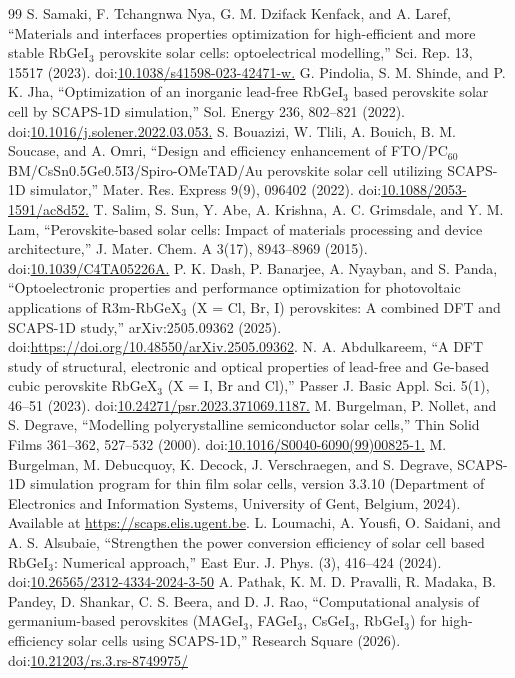 \documentclass[aip,amsmath,amssymb,preprint]{revtex4-2}
\begin{document}
\begin{thebibliography}{99}
 S. Samaki, F. Tchangnwa Nya, G. M. Dzifack Kenfack, and A. Laref, ``Materials and interfaces properties optimization for high-efficient and more stable RbGeI$_{3}$ perovskite solar cells: optoelectrical modelling,'' Sci. Rep. 13, 15517 (2023). doi:\url{10.1038/s41598-023-42471-w.}
 G. Pindolia, S. M. Shinde, and P. K. Jha, ``Optimization of an inorganic lead-free RbGeI$_{3}$ based perovskite solar cell by SCAPS-1D simulation,'' Sol. Energy 236, 802--821 (2022). doi:\url{10.1016/j.solener.2022.03.053.}
 S. Bouazizi, W. Tlili, A. Bouich, B. M. Soucase, and A. Omri, ``Design and efficiency enhancement of FTO/\allowbreak{}PC$_{60}$BM/CsSn0.5Ge0.5I3/\allowbreak{}Spiro-OMeTAD/\allowbreak{}Au perovskite solar cell utilizing SCAPS-1D simulator,'' Mater. Res. Express 9(9), 096402 (2022). doi:\url{10.1088/2053-1591/ac8d52.}
 T. Salim, S. Sun, Y. Abe, A. Krishna, A. C. Grimsdale, and Y. M. Lam, ``Perovskite-based solar cells: Impact of materials processing and device architecture,'' J. Mater. Chem. A 3(17), 8943--8969 (2015). doi:\url{10.1039/C4TA05226A.}
 P. K. Dash, P. Banarjee, A. Nyayban, and S. Panda, ``Optoelectronic properties and performance optimization for photovoltaic applications of R3m-RbGeX$_{3}$ (X = Cl, Br, I) perovskites: A combined DFT and SCAPS-1D study,'' arXiv:2505.09362 (2025). doi:\url{https://doi.org/10.48550/arXiv.2505.09362}.
 N. A. Abdulkareem, ``A DFT study of structural, electronic and optical properties of lead-free and Ge-based cubic perovskite RbGeX$_{3}$ (X = I, Br and Cl),'' Passer J. Basic Appl. Sci. 5(1), 46--51 (2023). doi:\url{10.24271/psr.2023.371069.1187.}
 M. Burgelman, P. Nollet, and S. Degrave, ``Modelling polycrystalline semiconductor solar cells,'' Thin Solid Films 361--362, 527--532 (2000). doi:\url{10.1016/S0040-6090(99)00825-1.}
 M. Burgelman, M. Debucquoy, K. Decock, J. Verschraegen, and S. Degrave, SCAPS-1D simulation program for thin film solar cells, version 3.3.10 (Department of Electronics and Information Systems, University of Gent, Belgium, 2024). Available at \url{https://scaps.elis.ugent.be}.
 L. Loumachi, A. Yousfi, O. Saidani, and A. S. Alsubaie, ``Strengthen the power conversion efficiency of solar cell based RbGeI$_{3}$: Numerical approach,'' East Eur. J. Phys. (3), 416--424 (2024). doi:\url{10.26565/2312-4334-2024-3-50}
 A. Pathak, K. M. D. Pravalli, R. Madaka, B. Pandey, D. Shankar, C. S. Beera, and D. J. Rao, ``Computational analysis of germanium-based perovskites (MAGeI$_{3}$, FAGeI$_{3}$, CsGeI$_{3}$, RbGeI$_{3}$) for high-efficiency solar cells using SCAPS-1D,'' Research Square (2026). doi:\url{10.21203/rs.3.rs-8749975/}

\end{thebibliography}
\end{document}
